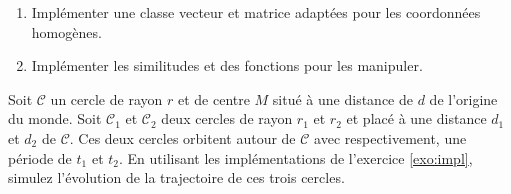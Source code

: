 \documentclass[a4paper,12pt]{article}
\begin{document}
\newpage

\label{exo:impl}
\begin{enumerate}
  \item Implémenter une classe vecteur et matrice adaptées pour les coordonnées homogènes.

  \item Implémenter les similitudes et des fonctions pour les manipuler.
\end{enumerate}

\newpage


Soit $\mathcal{C}$ un cercle de rayon $r$ et de centre $M$ situé à une distance de $d$ de l'origine du monde. Soit $\mathcal{C}_1$ et $\mathcal{C}_2$ deux cercles de rayon $r_1$ et $r_2$ et placé à une distance $d_1$ et $d_2$ de $\mathcal{C}$. Ces deux cercles orbitent autour de $\mathcal{C}$ avec respectivement, une période de $t_1$ et $t_2$.
En utilisant les implémentations de l'exercice \ref{exo:impl}, simulez l'évolution de la trajectoire de ces trois cercles.
\end{document}
